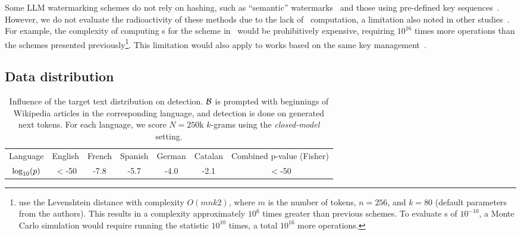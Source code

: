 Some LLM watermarking schemes do not rely on hashing, such as ``semantic'' watermarks~\citep{liu2023semantic, liu2024adaptive, fu2024watermarking} and those using pre-defined key sequences~\citep{kuditipudi2023robust}. 
However, we do not evaluate the radioactivity of these methods due to the lack of \pval\ computation, a limitation also noted in other studies~\citep{piet2023mark}. 
For example, the complexity of computing \pval s for the scheme in~\citet{kuditipudi2023robust} would be prohibitively expensive, requiring $10^{16}$ times more operations than the schemes presented previously\footnote{
    \citet{kuditipudi2023robust} use the Levenshtein distance with complexity $O(mnk2)$, where $m$ is the number of tokens, $n=256$, and $k=80$ (default parameters from the authors). 
    This results in a complexity approximately $10^6$ times greater than previous schemes. 
    To evaluate \pval s of $10^{-10}$, a Monte Carlo simulation would require running the statistic $10^{10}$ times, a total $10^{16}$ more operations.
}. 
This limitation would also apply to works based on the same key management~\citep{christ2023undetectable, liu2023semantic}.









\subsection{Data distribution}

\begin{table}[t!]
        \centering
        \caption{
            Influence of the target text distribution on detection.
            $\mathcal B$ is prompted with beginnings of Wikipedia articles in the corresponding language, and detection is done on generated next tokens. 
            For each language, we score $N=250$k $k$-grams using the \textit{closed-model} setting.
        }
        \label{chap6/tab:exp_language}
        \footnotesize
        \begin{tabular}{ c *{6}{c} }
            Language &  English & French & Spanish & German & Catalan & Combined p-value (Fisher) \\
            \shline
                $\log_{10}(p)$ & $<$-50 & -7.8 &  -5.7 &  -4.0 &  -2.1 & $<$-50  \\
        \end{tabular}
    \end{table}
    

